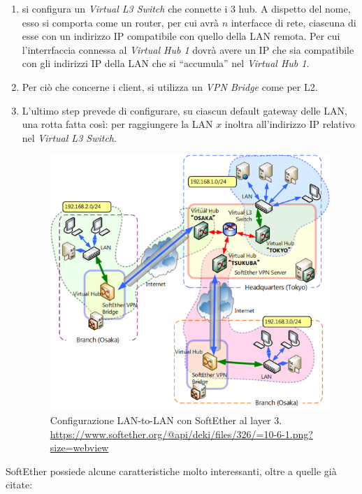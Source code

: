 \begin{itemize}
\begin{itemize}
\begin{enumerate}
      \item si configura un \textit{Virtual L3 Switch} che connette i 3 hub. A dispetto del nome,
      esso si comporta come un router, per cui avrà $n$ interfacce di rete, ciascuna di esse con un
      indirizzo IP compatibile con quello della LAN remota. Per cui l'interrfaccia connessa al \textit{Virtual Hub 1}
      dovrà avere un IP che sia compatibile con gli indirizzi IP della LAN che si ``accumula'' nel \textit{Virtual
      Hub 1}.
      \item Per ciò che concerne i client, si utilizza un \textit{VPN Bridge} come
      per L2.
      \item L'ultimo step prevede di configurare, su ciascun default gateway delle LAN, una rotta fatta
      così: per raggiungere la LAN $x$ inoltra all'indirizzo IP relativo nel \textit{Virtual L3 Switch}.
      \begin{figure}
        \includegraphics[scale=0.45]{img/softether_l3_lan_to_lan}
        \caption[Configurazione LAN-to-LAN con SoftEther al layer 3]{Configurazione LAN-to-LAN con SoftEther al layer 3.
          \url{https://www.softether.org/@api/deki/files/326/=10-6-1.png?size=webview}}
          \label{fig:softether_l3_lan_to_lan}
      \end{figure}
    \end{enumerate}
  \end{itemize}
\end{itemize}
SoftEther possiede alcune caratteristiche molto interessanti, oltre a quelle già citate:

